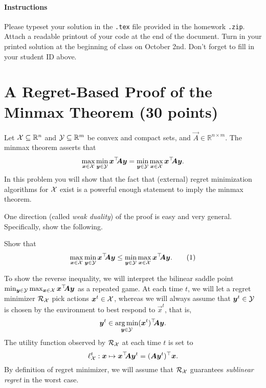 \documentclass{homework}
\begin{document}
\maketitle

\paragraph{Instructions} Please typeset your solution in the \texttt{.tex} file provided in the homework \texttt{.zip}. Attach a readable printout of your code at the end of the document. Turn in your printed solution at the beginning of class on October 2nd. Don't forget to fill in your student ID above.

\section{A Regret-Based Proof of the Minmax Theorem (30 points)}

Let $\mathcal{X} \subseteq \mathbb{R}^n$ and $\mathcal{Y} \subseteq \mathbb{R}^m$ be convex and compact sets, and $\vec{A} \in \mathbb{R}^{n\times m}$. The minmax theorem asserts that
\[
    \max_{\bm{x}\in\mathcal{X}}\min_{\bm{y}\in\mathcal{Y}} \bm{x}^\top\!\! \bm{A} \bm{y} = \min_{\bm{y}\in\mathcal{Y}}\max_{\bm{x}\in\mathcal{X}} \bm{x}^\top\!\! \bm{A} \bm{y}.
\]
In this problem you will show that the fact that (external) regret minimization algorithms for
$\mathcal{X}$ exist is a powerful enough statement to imply the minmax theorem.

One direction (called \emph{weak duality}) of the proof is easy and very general. Specifically, show the following.

\begin{problem}[8 points]
    Show that
    \[
        \max_{\vec{x}\in\cX}\min_{\vec{y}\in\cY} \vec{x}^\top\!\! \vec{A} \vec{y} \le \min_{\vec{y}\in\cY}\max_{\vec{x}\in\cX} \vec{x}^\top\!\! \vec{A} \vec{y}.
        \numberthis{eq:weak duality}
    \]
\end{problem}
\begin{solution}
\end{solution}


\noindent To show the reverse inequality, we will interpret the bilinear saddle point $\min_{\bm{y}\in\mathcal{Y}}\max_{\bm{x}\in\mathcal{X}} \bm{x}^\top\!\! \bm{A} \bm{y}$ as a repeated game. At each time $t$, we will let a regret minimizer $\mathcal{R}_{\mathcal{X}}$ pick actions $\bm{x}^t \in\mathcal{X}$, whereas we will always assume that $\bm{y}^t \in\mathcal{Y}$ is chosen by the environment to best respond to $\vec{x}^t$, that is,
\[
    \bm{y}^t \in \operatorname*{arg\,min}_{\bm{y} \in \mathcal{Y}} (\bm{x}^t)^\top\!\! \bm{A} \bm{y}.
\]
The utility function observed by $\mathcal{R}_{\mathcal{X}}$ at each time $t$ is set to
\begin{equation*}
    \ell^t_{\mathcal{X}} : \bm{x} \mapsto \bm{x}^\top\!\!\bm{A}\bm{y}^t = (\bm{A}\bm{y}^t)^\top \bm{x}.
\end{equation*}
By definition of regret minimizer, we will assume that $\mathcal{R}_{\mathcal{X}}$ guarantees \emph{sublinear regret} in the worst case.
\end{document}
